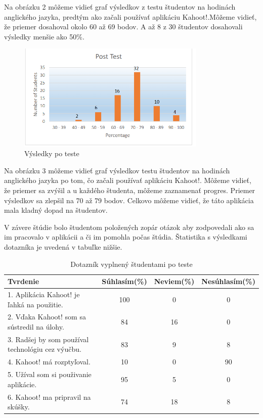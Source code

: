 \documentclass[10pt,oneside,slovak,a4paper]{article}
\begin{document}
Na obrázku 2 môžeme vidieť graf výsledkov z testu študentov na hodinách anglického jazyka, predtým ako začali používať aplikáciu Kahoot!.Môžeme vidieť, že priemer dosahoval okolo 60 až 69 bodov. A až 8  z 30 študentov dosahovali výsledky menšie ako 50\%.
\begin{figure}[h] %
\centering
\includegraphics[width=9cm]{Poteste.png}
\caption{
Výsledky po teste\cite{medina2017}
}
\end{figure}

Na obrázku 3 môžeme vidieť graf výsledkov testu študentov na hodinách anglického jazyka po tom, čo začali používať aplikáciu Kahoot!. Môžeme vidieť, že priemer sa zvýšil a u každého študenta, môžeme zaznamenať progres. Priemer výsledkov sa zlepšil na 70 až 79 bodov. Celkovo môžeme vidieť, že táto aplikácia mala kladný dopad na študentov.

V závere štúdie bolo študentom položených zopár otázok aby zodpovedali ako sa im pracovalo v aplikácii a či im pomohla počas štúdia. Štatistika s výsledkami dotazníka je uvedená v tabuľke nižšie.

\begin{table}[tbh]
\centering
\begin{tabular}{@{}|l|c|c|c|@{}}
\toprule
Tvrdenie & Súhlasím(\%)  & Neviem(\%)  & Nesúhlasím(\%)  \\ \midrule
 1. Aplikácia Kahoot! je ľahká na použitie. & 100 & 0 & 0          \\ \midrule
 2. Vďaka Kahoot! som sa sústredil na úlohy. & 84 & 16 & 0        \\ \midrule
3. Radšej by som používal technológiu cez výučbu. & 83 & 9 & 8  \\ \midrule
4. Kahoot! má rozptyľoval. & 10 & 0 & 90\\ \midrule
5. Užíval som si použivanie aplikácie. & 95 & 5 & 0 
    \\ \midrule
6. Kahoot! ma pripravil na skúšky. & 74 & 18 & 8        \\ \bottomrule
\end{tabular}
\caption{\label{tab:Štatistika}Dotazník vyplnený študentami po teste}
\end{table}
\end{document}
